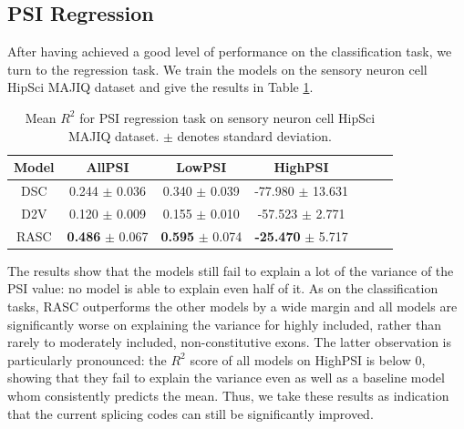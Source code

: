 %

















\subsection{PSI Regression} \label{subsubsec:psi_regression}
After having achieved a good level of performance on the classification task, we turn to the regression task. We train the models on the sensory neuron cell HipSci MAJIQ dataset and give the results in Table \ref{table:psi_regression}. 


\begin{table}
	\centering
	\begin{tabular}{ c c c c c c c} 
		\hline
		Model & AllPSI &  LowPSI &  HighPSI \\
		\hline
		DSC	&	0.244   $\pm$	0.036	&	0.340	$\pm$	0.039	&	-77.980	$\pm$	13.631\\
		D2V	&	0.120	$\pm$	0.009	&	0.155	$\pm$	0.010	&	-57.523	$\pm$	2.771\\
		RASC	&	\textbf{0.486}	$\pm$	0.067	&	\textbf{0.595}	$\pm$	0.074	&	\textbf{-25.470}	$\pm$	5.717\\
		\hline
	\end{tabular}
	\caption{Mean $R^2$ for PSI regression task on sensory neuron cell HipSci MAJIQ dataset.  $\pm$ denotes standard deviation. 
	}
	\label{table:psi_regression}
\end{table}


The results show that the models still fail to explain a lot of the variance of the PSI value: no model is able to explain even half of it. 
As on the classification tasks, RASC outperforms the other models by a wide margin and all models are significantly worse on explaining the variance for highly included, rather than rarely to moderately included, non-constitutive exons. The latter observation is particularly pronounced: the $R^2$ score of all models on HighPSI is below 0, showing that they fail to explain the variance even as well as a baseline model whom consistently predicts the mean. Thus, we take these results as indication that the current splicing codes can still be significantly improved. 



